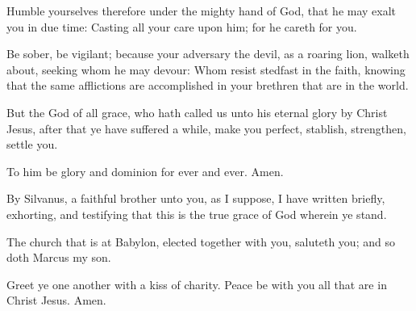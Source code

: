 \verse Humble yourselves therefore under the mighty hand of God, that he may exalt you in due time: \verse Casting all your care upon him; for he careth for you.

\verse Be sober, be vigilant; because your adversary the devil, as a roaring lion, walketh about, seeking whom he may devour: \verse Whom resist stedfast in the faith, knowing that the same afflictions are accomplished in your brethren that are in the world.

\verse But the God of all grace, who hath called us unto his eternal glory by Christ Jesus, after that ye have suffered a while, make you perfect, stablish, strengthen, settle you.

\verse To him be glory and dominion for ever and ever. Amen.

\verse By Silvanus, a faithful brother unto you, as I suppose, I have written briefly, exhorting, and testifying that this is the true grace of God wherein ye stand.

\verse The church that is at Babylon, elected together with you, saluteth you; and so doth Marcus my son.

\verse Greet ye one another with a kiss of charity. Peace be with you all that are in Christ Jesus. Amen.

